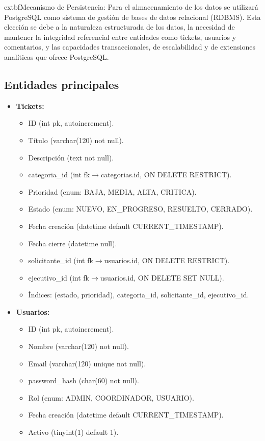 \documentclass[12pt,a4paper]{article}
\begin{document}
	extbf{Mecanismo de Persistencia:} Para el almacenamiento de los datos se utilizará PostgreSQL como sistema de gestión de bases de datos relacional (RDBMS). Esta elección se debe a la naturaleza estructurada de los datos, la necesidad de mantener la integridad referencial entre entidades como tickets, usuarios y comentarios, y las capacidades transaccionales, de escalabilidad y de extensiones analíticas que ofrece PostgreSQL.

\subsection{Entidades principales}

\begin{itemize}
    \item \textbf{Tickets:}
    \begin{itemize}[left=1.5em,nosep]
        \item ID (int pk, autoincrement).
        \item Título (varchar(120) not null).
        \item Descripción (text not null).
        \item categoria\_id (int fk$\rightarrow$categorias.id, ON DELETE RESTRICT).
        \item Prioridad (enum: BAJA, MEDIA, ALTA, CRITICA).
        \item Estado (enum: NUEVO, EN\_PROGRESO, RESUELTO, CERRADO).
        \item Fecha creación (datetime default CURRENT\_TIMESTAMP).
        \item Fecha cierre (datetime null).
        \item solicitante\_id (int fk$\rightarrow$usuarios.id, ON DELETE RESTRICT).
        \item ejecutivo\_id (int fk$\rightarrow$usuarios.id, ON DELETE SET NULL).
        \item Índices: (estado, prioridad), categoria\_id, solicitante\_id, ejecutivo\_id.
    \end{itemize}

    \item \textbf{Usuarios:}
    \begin{itemize}[left=1.5em,nosep]
        \item ID (int pk, autoincrement).
        \item Nombre (varchar(120) not null).
        \item Email (varchar(120) unique not null).
        \item password\_hash (char(60) not null).
        \item Rol (enum: ADMIN, COORDINADOR, USUARIO).
        \item Fecha creación (datetime default CURRENT\_TIMESTAMP).
        \item Activo (tinyint(1) default 1).
    \end{itemize}


\end{itemize}
\end{document}
